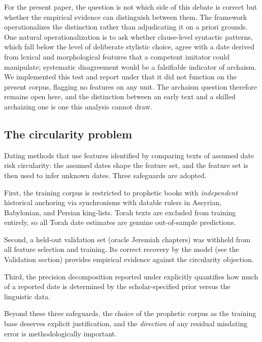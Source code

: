 \documentclass[10pt,letterpaper]{article}
\begin{document}
For the present paper, the question is not which side of this debate is
correct but whether the empirical evidence can distinguish between them.
The framework operationalizes the distinction rather than adjudicating it
on a priori grounds.  One natural operationalization is to ask whether
clause-level syntactic patterns, which fall below the level of deliberate
stylistic choice, agree with a date derived from lexical and morphological
features that a competent imitator could manipulate; systematic
disagreement would be a falsifiable indicator of archaism.  We implemented
this test and report under  that it did not function
on the present corpus, flagging no features on any unit.  The archaism
question therefore remains open here, and the distinction between an early
text and a skilled archaizing one is one this analysis cannot draw.

\subsection*{The circularity problem}

Dating methods that use features identified by comparing texts of assumed
date risk circularity: the assumed dates shape the feature set, and the
feature set is then used to infer unknown dates.  Three safeguards are
adopted.

First, the training corpus is restricted to prophetic books with
\emph{independent} historical anchoring via synchronisms with datable
rulers in Assyrian, Babylonian, and Persian king-lists.  Torah texts
are excluded from training entirely, so all Torah date estimates are
genuine out-of-sample predictions.

Second, a held-out validation set (oracle Jeremiah chapters) was
withheld from all feature selection and training.  Its correct recovery by
the model (see the Validation section) provides empirical evidence against
the circularity objection.

Third, the precision decomposition reported under 
explicitly quantifies
how much of a reported date is determined by the scholar-specified
prior versus the linguistic data.

Beyond these three safeguards, the choice of the prophetic corpus as the
training base deserves explicit justification, and the \emph{direction} of
any residual misdating error is methodologically important.
\end{document}

